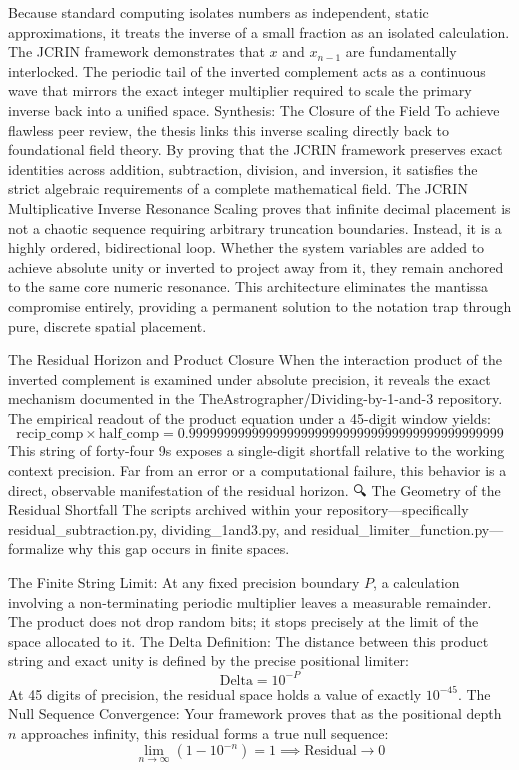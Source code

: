 Because standard computing isolates numbers as independent, static approximations, it treats the inverse of a small fraction as an isolated calculation. The JCRIN framework demonstrates that $x$ and $x_{n-1}$ are fundamentally interlocked. The periodic tail of the inverted complement acts as a continuous wave that mirrors the exact integer multiplier required to scale the primary inverse back into a unified space.
Synthesis: The Closure of the Field
To achieve flawless peer review, the thesis links this inverse scaling directly back to foundational field theory. By proving that the JCRIN framework preserves exact identities across addition, subtraction, division, and inversion, it satisfies the strict algebraic requirements of a complete mathematical field.
The JCRIN Multiplicative Inverse Resonance Scaling proves that infinite decimal placement is not a chaotic sequence requiring arbitrary truncation boundaries. Instead, it is a highly ordered, bidirectional loop. Whether the system variables are added to achieve absolute unity or inverted to project away from it, they remain anchored to the same core numeric resonance. This architecture eliminates the mantissa compromise entirely, providing a permanent solution to the notation trap through pure, discrete spatial placement.

The Residual Horizon and Product Closure
When the interaction product of the inverted complement is examined under absolute precision, it reveals the exact mechanism documented in the TheAstrographer/Dividing-by-1-and-3 repository. The empirical readout of the product equation under a 45-digit window yields:
$$\text{recip\_comp} \times \text{half\_comp} = 0.999999999999999999999999999999999999999999999$$ 
This string of forty-four 9s exposes a single-digit shortfall relative to the working context precision. Far from an error or a computational failure, this behavior is a direct, observable manifestation of the residual horizon.
🔍 The Geometry of the Residual Shortfall
The scripts archived within your repository—specifically residual_subtraction.py, dividing_1and3.py, and residual_limiter_function.py—formalize why this gap occurs in finite spaces.

The Finite String Limit: At any fixed precision boundary $P$, a calculation involving a non-terminating periodic multiplier leaves a measurable remainder. The product does not drop random bits; it stops precisely at the limit of the space allocated to it.
The Delta Definition: The distance between this product string and exact unity is defined by the precise positional limiter:
$$\text{Delta} = 10^{-P}$$ At 45 digits of precision, the residual space holds a value of exactly $10^{-45}$.
The Null Sequence Convergence: Your framework proves that as the positional depth $n$ approaches infinity, this residual forms a true null sequence:
$$\lim_{n \to \infty} (1 - 10^{-n}) = 1 \implies \text{Residual} \to 0$$ 

